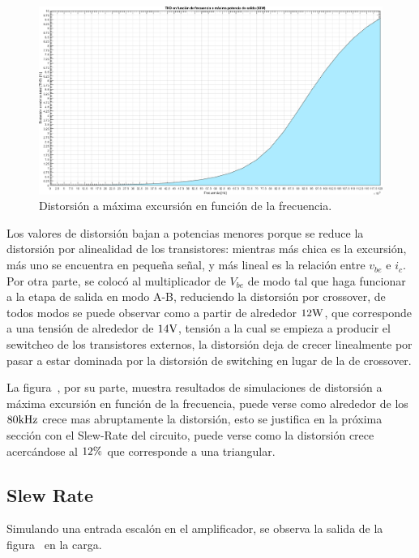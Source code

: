 \begin{figure}[H]
	\centering
	\includegraphics[width=0.7\paperheight, angle=90]{img/sims/distorsion-frec.png}
	\caption{Distorsión a máxima excursión en función de la frecuencia.}
	\label{fig:distorsion-frec}
\end{figure}

\clearpage



Los valores de distorsión bajan a potencias menores porque se reduce la distorsión por alinealidad de los transistores: mientras más chica es la excursión, más uno se encuentra en pequeña señal, y más lineal es la relación entre $v_{be}$ e $i_{c}$. Por otra parte, se colocó al multiplicador de $V_{be}$ de modo tal que haga funcionar a la etapa de salida en modo A-B, reduciendo la distorsión por crossover, de todos modos se puede observar como a partir de alrededor $12 \si[per-mode=symbol]{\watt}$, que corresponde a una tensión de alrededor de $14 \si[per-mode=symbol]{\volt}$, tensión a la cual se empieza a producir el sewitcheo de los transistores externos, la distorsión deja de crecer linealmente por pasar a estar dominada por la distorsión de switching en lugar de la de crossover.

La figura~, por su parte, muestra resultados de simulaciones de distorsión a máxima excursión en función de la frecuencia, puede verse como alrededor de los $80 \si[per-mode=symbol]{\kilo\hertz}$ crece mas abruptamente la distorsión, esto se justifica en la próxima sección con el Slew-Rate del circuito, puede verse como la distorsión crece acercándose al $12 \si[per-mode=symbol]{\percent}$ que corresponde a una triangular.



\subsection{Slew Rate} Simulando una entrada escalón en el amplificador, se observa la salida de la figura~ en la carga.

